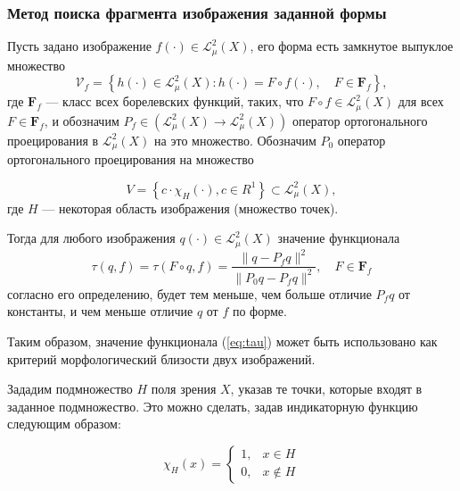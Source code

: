 \subsubsection{Метод поиска фрагмента изображения заданной формы}\label{morph_search}
Пусть задано изображение $f(\cdot) \in \mathcal{L}_{\mu}^2(X)$, его форма есть замкнутое выпуклое множество
\begin{equation*}
\mathcal{V}_f = \left\{ h(\cdot) \in \mathcal{L}_{\mu}^2(X) : h(\cdot) = F \circ f(\cdot), \quad F \in \mathbf{F}_f \right\},
\end{equation*}
где $\mathbf{F}_f$ --- класс всех борелевских функций, таких, что $F \circ f \in \mathcal{L}_{\mu}^2(X)$ для всех $F \in \mathbf{F}_f$, и обозначим $P_f \in \left( \mathcal{L}_{\mu}^2(X) \rightarrow \mathcal{L}_{\mu}^2(X) \right) $ оператор ортогонального проецирования в $\mathcal{L}_{\mu}^2(X)$ на это множество. Обозначим $P_0$ оператор ортогонального проецирования на множество

\begin{equation*}
V = \left\{ c \cdot \chi_{H}(\cdot), c \in R^1 \right\} \subset \mathcal{L}_{\mu}^2(X),
\end{equation*}
где $H$ --- некоторая область изображения (множество точек).


Тогда для любого изображения $q(\cdot) \in \mathcal{L}_{\mu}^2(X)$ значение функционала
\begin{equation}\label{eq:tau}
\tau(q, f) = \tau(F \circ q, f) = \frac{\|q - P_fq\|^2}{\|P_0q - P_fq\|^2}, \quad F \in \mathbf{F}_f
\end{equation}
согласно его определению, будет тем меньше, чем больше отличие $P_fq$ от константы, и чем меньше отличие $q$ от $f$ по форме.

Таким образом, значение функционала (\ref{eq:tau}) может быть использовано как критерий морфологический близости двух изображений.


Зададим подмножество $H$ поля зрения $X$, указав те точки, которые входят в заданное подмножество. Это можно сделать, задав индикаторную функцию следующим образом:

\begin{equation*}
\chi_H(x) =
\begin{cases}
   1, & x \in H\\
   0, & x \notin H
\end{cases}
\end{equation*}


